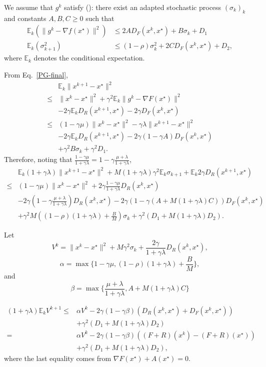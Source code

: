\documentclass{article}
\newcommand{\bE}{{\mathbb E}}
\theoremstyle{definition}
\begin{document}
We assume that $g^k$ satisfy (\cite{gorbunov2019unified}): there exist an adapted stochastic process $(\sigma_k)_k$ and constants $A,B,C \geq 0$ such that
\begin{align}
    \bE_k(\|g^k - \nabla f(x^\star)\|^2) &\leq 2AD_F(x^k,x^\star) + B\sigma_k + D_1\\
    \bE_k(\sigma_{k+1}^2) &\leq (1-\rho)\sigma_k^2 + 2CD_F(x^k,x^\star) + D_2,
\end{align}
where $\bE_k$ denotes the conditional expectation.

From Eq.~\eqref{PG-final},
\begin{align}
    &\bE_k\|x^{k+1} - x^\star\|^2 \\
    \leq& \|x^k - x^\star\|^2 + \gamma^2 \bE_k\|g^k - \nabla F(x^\star) \|^2\\
    &- 2\gamma \bE_k D_R(x^{k+1},x^\star) - 2\gamma D_F(x^{k},x^\star)\\
    \leq& (1-\gamma \mu)\|x^k - x^\star\|^2 - \gamma \lambda \|x^{k+1} - x^\star\|^2\\
    &- 2\gamma \bE_k D_R(x^{k+1},x^\star) - 2\gamma(1 - \gamma A) D_F(x^{k},x^\star)\\
    &+ \gamma^2 B \sigma_k + \gamma^2 D_1.
\end{align}
Therefore, noting that $\frac{1-\gamma\mu}{1+\gamma\lambda} = 1-\gamma\frac{\mu+\lambda}{1+\gamma\lambda}$,
\begin{align}
    &\bE_k (1+\gamma \lambda)\|x^{k+1} - x^\star\|^2 + M(1+\gamma\lambda)\gamma^2 \bE_k \sigma_{k+1} + \bE_k 2\gamma D_R(x^{k+1},x^\star)\\
    \leq& (1-\gamma\mu)\|x^k - x^\star\|^2 + 2\gamma \frac{1-\gamma\mu}{1+\gamma\lambda} D_R(x^{k},x^\star)\\
    &- 2\gamma \left(1-\gamma\frac{\mu+\lambda}{1+\gamma\lambda}\right) D_R(x^{k},x^\star) - 2\gamma(1 - \gamma (A + M(1+\gamma\lambda)C)) D_F(x^{k},x^\star)\\
    &+ \gamma^2 M \left((1-\rho)(1+\gamma\lambda) + \frac{B}{M}\right)\sigma_k + \gamma^2 (D_1 + M(1+\gamma\lambda)D_2).
\end{align}

Let $$V^k = \|x^{k} - x^\star\|^2 + M\gamma^2 \sigma_{k} +  \frac{2\gamma}{1+\gamma\lambda} D_R(x^{k},x^\star),$$ $$\alpha = \max\{1-\gamma\mu, (1-\rho)(1+\gamma\lambda) + \frac{B}{M}\},$$
and 
$$
\beta = \max\{\frac{\mu+\lambda}{1+\gamma\lambda},A + M(1+\gamma\lambda)C\}
$$

\begin{align}
    (1+\gamma\lambda)\bE_k V^{k+1}
    \leq& \alpha V^k - 2\gamma (1-\gamma\beta) (D_R(x^{k},x^\star) + D_F(x^{k},x^\star))\\
    &+\gamma^2 (D_1 + M(1+\gamma\lambda)D_2)\\
    =& \alpha V^k - 2\gamma (1-\gamma\beta) ((F+R)(x^k) - (F+R)(x^\star))\\
    &+\gamma^2 (D_1 + M(1+\gamma\lambda)D_2),
\end{align}
where the last equality comes from $\nabla F(x^\star) + A(x^\star) = 0$.
\end{document}
